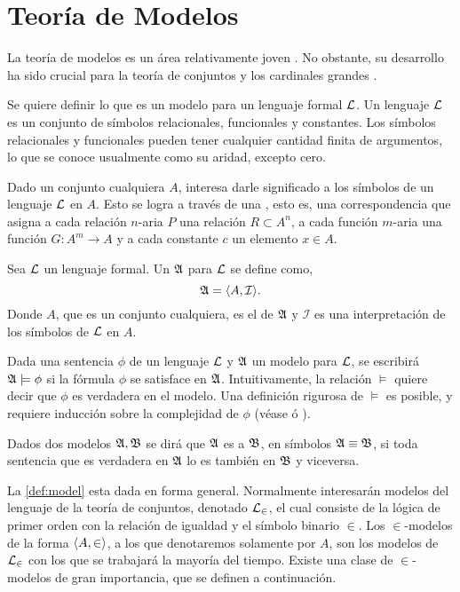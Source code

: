 \section{Teoría de Modelos}
\label{sec:models}

La teoría de modelos es un área relativamente joven \autocite[pág. 3]{chang_model_2012}.
No obstante, su desarrollo ha sido crucial para la teoría de conjuntos y los
cardinales grandes \autocite[pág. xv]{kanamori_higher_2009}.

Se quiere definir lo que es un modelo para un lenguaje formal $\mathcal { L }$.
Un lenguaje $\mathcal { L }$ es un conjunto de símbolos relacionales, funcionales y constantes.
Los símbolos relacionales y funcionales pueden tener cualquier cantidad finita de argumentos,
lo que se conoce usualmente como su aridad, excepto cero.

Dado un conjunto cualquiera $A$, interesa darle significado a los símbolos de un
lenguaje $\mathcal { L }$ en $A$. Esto se logra a través de una , esto es,
una correspondencia que asigna a cada relación $n$-aria $P$ una relación
$R\subset A^n$, a cada función $m$-aria una función $G\colon A^m\to A$ y a cada
constante $c$ un elemento $x\in A$.

\begin{defi}\label{def:model}
    Sea $\mathcal { L }$ un lenguaje formal. Un  $\mathfrak { A }$ para $\mathcal { L }$ se define como,
    \[
        \mathfrak { A } = \langle A, \mathcal{I} \rangle.
    \]
    Donde $A$, que es un conjunto cualquiera, es el  de $\mathfrak { A }$ y
    $\mathcal{I}$ es una interpretación de los símbolos de $\mathcal { L }$ en $A$.
\end{defi}

Dada una sentencia $\phi$ de un lenguaje $\mathcal { L }$ y $\mathfrak { A }$ un modelo para $\mathcal { L }$,
se escribirá $\mathfrak { A }\models\phi$ si la fórmula $\phi$ se satisface en $\mathfrak { A }$.
Intuitivamente, la relación $\models$ quiere decir que $\phi$ es verdadera en el modelo.
Una definición rigurosa de $\models$ es posible, y requiere inducción sobre la complejidad
de $\phi$ (véase \autocite[\S 1.3]{chang_model_2012} ó \autocite[\S 12]{jech_set_2003}).

Dados dos modelos $\mathfrak { A }, \mathfrak { B }$ se dirá que $\mathfrak { A }$ es  a $\mathfrak { B }$, en símbolos $\mathfrak { A }\equiv \mathfrak { B }$, si toda sentencia
que es verdadera en $\mathfrak { A }$ lo es también en $\mathfrak { B }$ y viceversa.

La \cref{def:model} esta dada en forma general. Normalmente interesarán modelos
del lenguaje de la teoría de conjuntos, denotado $\mathcal { L }_\in$, el cual consiste de la lógica de
primer orden con la relación de igualdad y el símbolo binario $\in$.
Los $\in$-modelos de la forma $\langle A,\in \rangle$, a los que denotaremos
solamente por $A$, son los modelos de $\mathcal { L }_\in$ con los que se trabajará la mayoría del tiempo.
Existe una clase de $\in$-modelos de gran importancia, que se definen a continuación.

